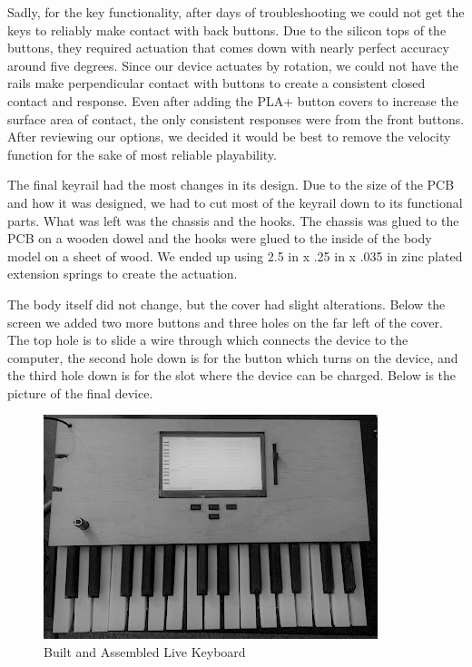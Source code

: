 Sadly, for the key functionality, after days of troubleshooting we could not get the keys to reliably make contact with back buttons. Due to the silicon tops of the buttons, they required actuation that comes down with nearly perfect accuracy around five degrees. Since our device actuates by rotation, we could not have the rails make perpendicular contact with buttons to create a consistent closed contact and response. Even after adding the PLA+ button covers to increase the surface area of contact, the only consistent responses were from the front buttons. After reviewing our options, we decided it would be best to remove the velocity function for the sake of most reliable playability.

The final keyrail had the most changes in its design. Due to the size of the PCB and how it was designed, we had to cut most of the keyrail down to its functional parts. What was left was the chassis and the hooks. The chassis was glued to the PCB on a wooden dowel and the hooks were glued to the inside of the body model on a sheet of wood. We ended up using 2.5 in x .25 in x .035 in zinc plated extension springs to create the actuation.

The body itself did not change, but the cover had slight alterations. Below the screen we added two more buttons and three holes on the far left of the cover. The top hole is to slide a wire through which connects the device to the computer, the second hole down is for the button which turns on the device, and the third hole down is for the slot where the device can be charged. Below is the picture of the final device.

\begin{figure}[h!]
  \centering
  \includegraphics[width=0.8\linewidth]{image/Keyboard_Photo.jpg}
  \caption{Built and Assembled Live Keyboard}
  \label{fig:keyboard_photo}
\end{figure}

